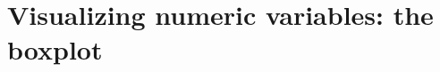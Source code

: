 \documentclass[]{report}\usepackage[]{graphicx}\usepackage[]{color}
\begin{document}
% 
% 
% 
% 
%


\section{Visualizing numeric variables: the boxplot}
\end{document}
